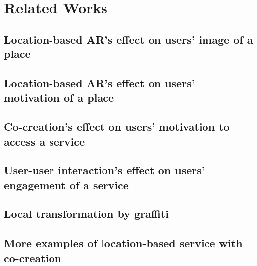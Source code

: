 \chapter{Related Works} \label{ch:3}

\section{Location-based AR's effect on users’ image of a place}

\section{Location-based AR's effect on users’ motivation of a place}

\section{Co-creation's effect on users’ motivation to access a service}

\section{User-user interaction's effect on users’ engagement of a service}

\section{Local transformation by graffiti}

\section{More examples of location-based service with co-creation}
